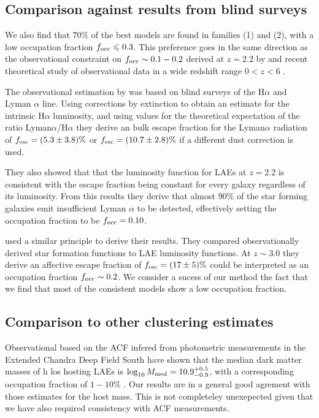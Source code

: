 \documentclass[usenatbib]{mn2e}
\newcommand{\Msun}{{\ifmmode{{\rm {M_{\odot}}}}\else{${\rm{M_{\odot}}}$}\fi}}
\begin{document}
\subsection{Comparison against results from blind surveys}


We also find that $70\%$ of the best models are found in families (1)
and (2), with a low occupation fraction $f_{\rm occ}\leq 0.3$. This
preference goes in the same direction as the observational constraint
on $f_{\rm occ}\sim 0.1-0.2$ derived at $z=2.2$ by \cite{Hayes2010}
and recent theoretical study of observational data in a wide redshift
range $0<z<6$  \citep{Dijkstra2013}. 

The observational estimation by \cite{Hayes2010} was based on blind
surveys of the H$\alpha$ and Lyman $\alpha$ line. Using corrections by
extinction to obtain an estimate for the intrinsic H$\alpha$
luminosity, and using values for the theoretical expectation of the
ratio Lyman$\alpha$/H$\alpha$ they derive an bulk escape fraction for
the Lyman$\alpha$ radiation of $f_{\rm esc}=(5.3\pm 3.8)\%$ or $f_{\rm
  esc}=(10.7\pm 2.8)\%$ if a different dust correction is used. 

They also showed that that the luminosity function for LAEs at $z=2.2$ is
consistent with the escape fraction being constant for every galaxy
regardless of its luminosity. From this results they derive that
almost $90\%$ of the star forming galaxies emit insufficient
Lyman $\alpha$ to be detected, effectively setting the occupation
fraction to be $f_{\rm occ}=0.10$.  

\cite{Dijkstra2013} used a similar principle to derive their results. They
compared observationally derived star formation functions to LAE
luminosity functions. At $z\sim 3.0$ they derive an affective escape
fraction of $f_{\rm esc}=(17\pm 5)\%$ could be interpreted as an
occupation fraction $f_{\rm occ}\sim 0.2$.  We consider a sucess of
our method the fact that we find that most of the consistent models
show a low occupation fraction.    



\subsection{Comparison to other clustering estimates}

Observational based on the ACF infered from photometric measurements
in the Extended Chandra Deep Field South have shown that the median
dark matter masses of h los hosting LAEs is $\log_{10}M_{\rm
  med}=10.9^{+0.5}_{-0.9}$\Msun, with a corresponding occupation
fraction of $1-10\%$  \citep{Gawiser07}.  Our results are in a general
good agrement with those estimates for the host mass. This is not
completeley unexepected given that we have also required consistency
with ACF measurements.   
\end{document}
